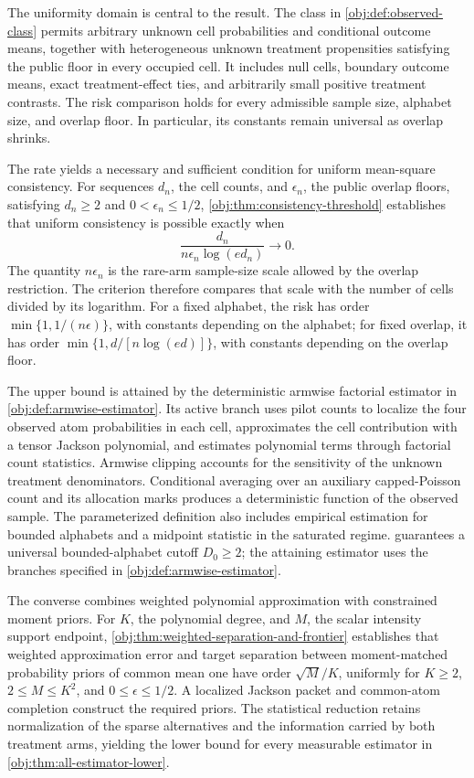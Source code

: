 The uniformity domain is central to the result. The class in \cref{obj:def:observed-class} permits arbitrary unknown cell probabilities and conditional outcome means, together with heterogeneous unknown treatment propensities satisfying the public floor in every occupied cell. It includes null cells, boundary outcome means, exact treatment-effect ties, and arbitrarily small positive treatment contrasts. The risk comparison holds for every admissible sample size, alphabet size, and overlap floor. In particular, its constants remain universal as overlap shrinks.

The rate yields a necessary and sufficient condition for uniform mean-square consistency. For sequences \(d_n\), the cell counts, and \(\epsilon_n\), the public overlap floors, satisfying \(d_n\ge2\) and \(0<\epsilon_n\le1/2\), \cref{obj:thm:consistency-threshold} establishes that uniform consistency is possible exactly when
\[
\frac{d_n}{n\epsilon_n\log(e d_n)}\longrightarrow0.
\]
The quantity \(n\epsilon_n\) is the rare-arm sample-size scale allowed by the overlap restriction. The criterion therefore compares that scale with the number of cells divided by its logarithm. For a fixed alphabet, the risk has order \(\min\{1,1/(n\epsilon)\}\), with constants depending on the alphabet; for fixed overlap, it has order \(\min\{1,d/[n\log(ed)]\}\), with constants depending on the overlap floor.

The upper bound is attained by the deterministic armwise factorial estimator in \cref{obj:def:armwise-estimator}. Its active branch uses pilot counts to localize the four observed atom probabilities in each cell, approximates the cell contribution with a tensor Jackson polynomial, and estimates polynomial terms through factorial count statistics. Armwise clipping accounts for the sensitivity of the unknown treatment denominators. Conditional averaging over an auxiliary capped-Poisson count and its allocation marks produces a deterministic function of the observed sample. The parameterized definition also includes empirical estimation for bounded alphabets and a midpoint statistic in the saturated regime.  guarantees a universal bounded-alphabet cutoff \(D_0\ge2\); the attaining estimator uses the branches specified in \cref{obj:def:armwise-estimator}.

The converse combines weighted polynomial approximation with constrained moment priors. For \(K\), the polynomial degree, and \(M\), the scalar intensity support endpoint, \cref{obj:thm:weighted-separation-and-frontier} establishes that weighted approximation error and target separation between moment-matched probability priors of common mean one have order \(\sqrt M/K\), uniformly for \(K\ge2\), \(2\le M\le K^2\), and \(0\le\epsilon\le1/2\). A localized Jackson packet and common-atom completion construct the required priors. The statistical reduction retains normalization of the sparse alternatives and the information carried by both treatment arms, yielding the lower bound for every measurable estimator in \cref{obj:thm:all-estimator-lower}.

